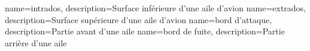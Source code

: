 {
    name=intrados,
    description={Surface inférieure d'une aile d'avion}
}
{
    name=extrados,
    description={Surface supérieure d'une aile d'avion}
}
{
    name=bord d'attaque,
    description={Partie avant d'une aile}
}
{
    name=bord de fuite,
    description={Partie arrière d'une aile}
}

